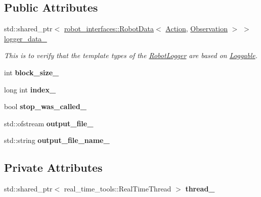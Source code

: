 \subsection*{Public Attributes}
\begin{DoxyCompactItemize}
\item 
std\+::shared\+\_\+ptr$<$ \hyperlink{classrobot__interfaces_1_1RobotData}{robot\+\_\+interfaces\+::\+Robot\+Data}$<$ \hyperlink{classAction}{Action}, \hyperlink{classObservation}{Observation} $>$ $>$ \hyperlink{classrobot__interfaces_1_1RobotLogger_ad1391bc38ff516f01b3c8bdd91e27efc}{logger\+\_\+data\+\_\+}
\begin{DoxyCompactList}\small\item\em This is to verify that the template types of the \hyperlink{classrobot__interfaces_1_1RobotLogger}{Robot\+Logger} are based on \hyperlink{classrobot__interfaces_1_1Loggable}{Loggable}. \end{DoxyCompactList}\item 
int {\bfseries block\+\_\+size\+\_\+}\hypertarget{classrobot__interfaces_1_1RobotLogger_a0465f86efac78a429f8980bd2a12959e}{}\label{classrobot__interfaces_1_1RobotLogger_a0465f86efac78a429f8980bd2a12959e}

\item 
long int {\bfseries index\+\_\+}\hypertarget{classrobot__interfaces_1_1RobotLogger_ac47398855bcb94ca8a3e83334ee1d382}{}\label{classrobot__interfaces_1_1RobotLogger_ac47398855bcb94ca8a3e83334ee1d382}

\item 
bool {\bfseries stop\+\_\+was\+\_\+called\+\_\+}\hypertarget{classrobot__interfaces_1_1RobotLogger_a133c310dcabe26cb8918dad08ed96a90}{}\label{classrobot__interfaces_1_1RobotLogger_a133c310dcabe26cb8918dad08ed96a90}

\item 
std\+::ofstream {\bfseries output\+\_\+file\+\_\+}\hypertarget{classrobot__interfaces_1_1RobotLogger_aa03a18fb24545744533c39e193c5920a}{}\label{classrobot__interfaces_1_1RobotLogger_aa03a18fb24545744533c39e193c5920a}

\item 
std\+::string {\bfseries output\+\_\+file\+\_\+name\+\_\+}\hypertarget{classrobot__interfaces_1_1RobotLogger_a180a1ad565fd1a2342c6a40465fea731}{}\label{classrobot__interfaces_1_1RobotLogger_a180a1ad565fd1a2342c6a40465fea731}

\end{DoxyCompactItemize}
\subsection*{Private Attributes}
\begin{DoxyCompactItemize}
\item 
std\+::shared\+\_\+ptr$<$ real\+\_\+time\+\_\+tools\+::\+Real\+Time\+Thread $>$ {\bfseries thread\+\_\+}\hypertarget{classrobot__interfaces_1_1RobotLogger_a6a9d7845a73b1d62d0f0ddf85240c336}{}\label{classrobot__interfaces_1_1RobotLogger_a6a9d7845a73b1d62d0f0ddf85240c336}

\end{DoxyCompactItemize}


